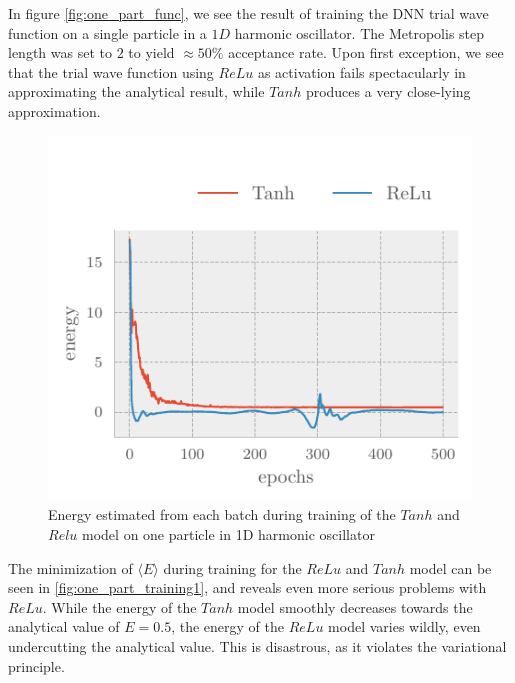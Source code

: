 In figure \autoref{fig:one_part_func}, we see the result of training the DNN trial wave function on a single particle in a $1D$ harmonic oscillator. The Metropolis step length was set to $2$ to yield $\approx 50\%$ acceptance rate. Upon first exception, we see that the trial wave function using $ReLu$ as activation fails spectacularly in approximating the analytical result, while $Tanh$ produces a very close-lying approximation. 

\begin{figure}[H]
	\includegraphics[]{figures/one_part_training1.pdf}
	\caption{Energy estimated from each batch during training of the $Tanh$ and $Relu$ model on one particle in 1D harmonic oscillator}
	\label{fig:one_part_training1}
\end{figure}

The minimization of $\langle E \rangle$ during training for the $ReLu$ and $Tanh$ model can be seen in \autoref{fig:one_part_training1}, and reveals even more serious problems with $ReLu$. While the energy of the $Tanh$ model smoothly decreases towards the analytical value of $E=0.5$, the energy of the $ReLu$ model varies wildly, even undercutting the analytical value. This is disastrous, as it violates the variational principle. 

